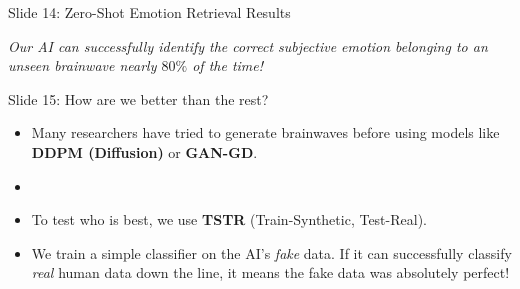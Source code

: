 \documentclass[aspectratio=169]{beamer}
\newcommand{\easysize}{\large}
\begin{document}

\begin{frame}{Slide 14: Zero-Shot Emotion Retrieval Results}
    \centering
    \begin{table}[h]
        \centering
    \end{table}
    \vspace{0.3cm}
    \textit{Our AI can successfully identify the correct subjective emotion belonging to an unseen brainwave nearly $80\%$ of the time!}
\end{frame}

\begin{frame}{Slide 15: How are we better than the rest?}
    \easysize
    \begin{itemize}
        \item Many researchers have tried to generate brainwaves before using models like \textbf{DDPM (Diffusion)} or \textbf{GAN-GD}.
        \item \vspace{0.3cm}
        \item To test who is best, we use \textbf{TSTR} (Train-Synthetic, Test-Real).
        \item We train a simple classifier on the AI's \textit{fake} data. If it can successfully classify \textit{real} human data down the line, it means the fake data was absolutely perfect!
    \end{itemize}
\end{frame}
\end{document}
